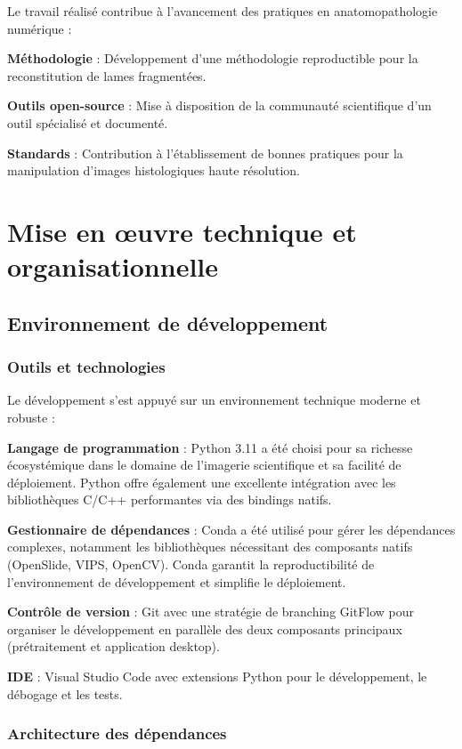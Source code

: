 \documentclass[12pt,a4paper]{report}
\begin{document}
Le travail réalisé contribue à l'avancement des pratiques en anatomopathologie numérique :

\textbf{Méthodologie} : Développement d'une méthodologie reproductible pour la reconstitution de lames fragmentées.

\textbf{Outils open-source} : Mise à disposition de la communauté scientifique d'un outil spécialisé et documenté.

\textbf{Standards} : Contribution à l'établissement de bonnes pratiques pour la manipulation d'images histologiques haute résolution.

\section{Mise en œuvre technique et organisationnelle}

\clearpage

\subsection{Environnement de développement}

\subsubsection{Outils et technologies}

Le développement s'est appuyé sur un environnement technique moderne et robuste :

\textbf{Langage de programmation} : Python 3.11 a été choisi pour sa richesse écosystémique dans le domaine de l'imagerie scientifique et sa facilité de déploiement. Python offre également une excellente intégration avec les bibliothèques C/C++ performantes via des bindings natifs.

\textbf{Gestionnaire de dépendances} : Conda a été utilisé pour gérer les dépendances complexes, notamment les bibliothèques nécessitant des composants natifs (OpenSlide, VIPS, OpenCV). Conda garantit la reproductibilité de l'environnement de développement et simplifie le déploiement.

\textbf{Contrôle de version} : Git avec une stratégie de branching GitFlow pour organiser le développement en parallèle des deux composants principaux (prétraitement et application desktop).

\textbf{IDE} : Visual Studio Code avec extensions Python pour le développement, le débogage et les tests.

\subsubsection{Architecture des dépendances}
\end{document}
